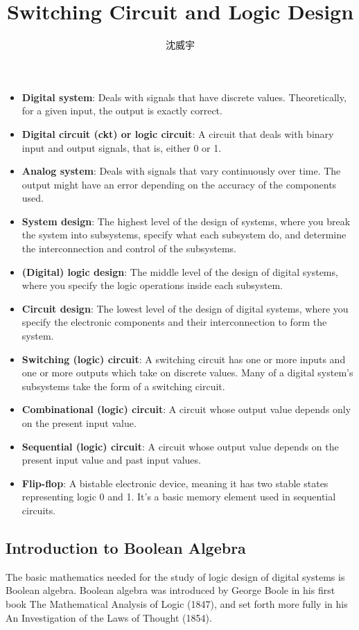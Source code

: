\documentclass[a4paper,12pt]{article}
\begin{document}
\title{Switching Circuit and Logic Design}
\author{沈威宇}
\date{\temtoday}
\titletocdoc
{}
\begin{itemize}
\item\textbf{Digital system}: Deals with signals that have discrete values. Theoretically, for a given input, the output is exactly correct.
\item\textbf{Digital circuit (ckt) or logic circuit}: A circuit that deals with binary input and output signals, that is, either 0 or 1.
\item\textbf{Analog system}: Deals with signals that vary continuously over time. The output might have an error depending on the accuracy of the components used.
\item\textbf{System design}: The highest level of the design of systems, where you break the system into subsystems, specify what each subsystem do, and determine the interconnection and control of the subsystems.
\item\textbf{(Digital) logic design}: The middle level of the design of digital systems, where you specify the logic operations inside each subsystem.
\item\textbf{Circuit design}: The lowest level of the design of digital systems, where you specify the electronic components and their interconnection to form the system.
\item\textbf{Switching (logic) circuit}: A switching circuit has one or more inputs and one or more outputs which take on discrete values. Many of a digital system's subsystems take the form of a switching circuit.
\item\textbf{Combinational (logic) circuit}: A circuit whose output value depends only on the present input value.
\item\textbf{Sequential (logic) circuit}: A circuit whose output value depends on the present input value and past input values.
\item\textbf{Flip-flop}: A bistable electronic device, meaning it has two stable states representing logic 0 and 1. It's a basic memory element used in sequential circuits.
\end{itemize}
\subsection{Introduction to Boolean Algebra}
The basic mathematics needed for the study of logic design of digital systems is Boolean algebra. Boolean algebra was introduced by George Boole in his first book The Mathematical Analysis of Logic (1847), and set forth more fully in his An Investigation of the Laws of Thought (1854).
\end{document}
